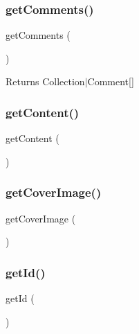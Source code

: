\subsubsection{\texorpdfstring{getComments()}{getComments()}}
{\footnotesize\ttfamily get\+Comments (\begin{DoxyParamCaption}{ }\end{DoxyParamCaption})}

\begin{DoxyReturn}{Returns}
Collection$\vert$\+Comment\mbox{[}\mbox{]} 
\end{DoxyReturn}
\mbox{\label{class_app_1_1_entity_1_1_ad_a58e43f09a06ce4e29b192c4e17ce7915}} 
\subsubsection{\texorpdfstring{getContent()}{getContent()}}
{\footnotesize\ttfamily get\+Content (\begin{DoxyParamCaption}{ }\end{DoxyParamCaption})}

\mbox{\label{class_app_1_1_entity_1_1_ad_af68dead1965a2a3240f96ae558e355f8}} 
\subsubsection{\texorpdfstring{getCoverImage()}{getCoverImage()}}
{\footnotesize\ttfamily get\+Cover\+Image (\begin{DoxyParamCaption}{ }\end{DoxyParamCaption})}

\mbox{\label{class_app_1_1_entity_1_1_ad_a12251d0c022e9e21c137a105ff683f13}} 
\subsubsection{\texorpdfstring{getId()}{getId()}}
{\footnotesize\ttfamily get\+Id (\begin{DoxyParamCaption}{ }\end{DoxyParamCaption})}

\mbox{\label{class_app_1_1_entity_1_1_ad_a47d8b8b7d4c420a60823d02a21527ae1}} 
